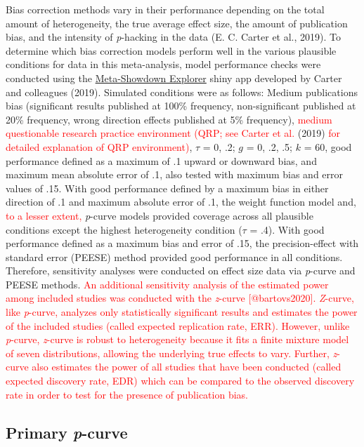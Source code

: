 \documentclass[
  english,
  man,floatsintext]{apa7}
\begin{document}
Bias correction methods vary in their performance depending on the total amount of heterogeneity, the true average effect size, the amount of publication bias, and the intensity of \emph{p}-hacking in the data (E. C. Carter et al., 2019). To determine which bias correction models perform well in the various plausible conditions for data in this meta-analysis, model performance checks were conducted using the \href{http://www.shinyapps.org/apps/metaExplorer/}{Meta-Showdown Explorer} shiny app developed by Carter and colleagues (2019). Simulated conditions were as follows: Medium publications bias (significant results published at 100\% frequency, non-significant published at 20\% frequency, wrong direction effects published at 5\% frequency), \textcolor{red}{medium questionable research practice environment (QRP; see Carter et al.} (2019) \textcolor{red}{for detailed explanation of QRP environment)}, \(\tau\) = 0, .2; \(g\) = 0, .2, .5; \(k\) = 60, good performance defined as a maximum of .1 upward or downward bias, and maximum mean absolute error of .1, also tested with maximum bias and error values of .15. With good performance defined by a maximum bias in either direction of .1 and maximum absolute error of .1, the weight function model and, \textcolor{red}{to a lesser extent,} \emph{p}-curve models provided coverage across all plausible conditions except the highest heterogeneity condition (\(\tau\) = .4). With good performance defined as a maximum bias and error of .15, the precision-effect with standard error (PEESE) method provided good performance in all conditions. Therefore, sensitivity analyses were conducted on effect size data via \emph{p}-curve and PEESE methods. \textcolor{red}{An additional sensitivity analysis of the estimated power among included studies was conducted with the \emph{z}-curve [@bartovs2020]. \emph{Z}-curve, like \emph{p}-curve, analyzes only statistically significant results and estimates the power of the included studies (called expected replication rate, ERR). However, unlike \emph{p}-curve, \emph{z}-curve is robust to heterogeneity because it fits a finite mixture model of seven distributions, allowing the underlying true effects to vary. Further, \emph{z}-curve also estimates the power of all studies that have been conducted (called expected discovery rate, EDR) which can be compared to the observed discovery rate in order to test for the presence of publication bias.}

\hypertarget{primary-p-curve}{%
\subsection{\texorpdfstring{Primary \emph{p}-curve}{Primary p-curve}}\label{primary-p-curve}}
\end{document}
